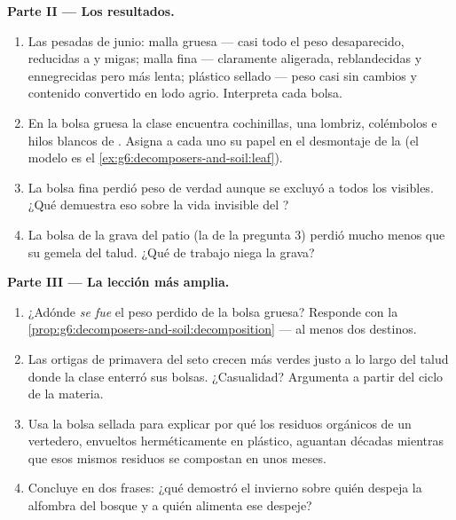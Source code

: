 \begin{problem}
\medskip\noindent\textbf{Parte II --- Los resultados.}
\begin{enumerate}[resume]
  \item Las pesadas de junio: malla gruesa --- casi todo el peso
        desaparecido,  reducidas a  y migas; malla fina
        --- claramente aligerada,  reblandecidas y ennegrecidas
        pero más lenta; plástico sellado --- peso casi sin cambios y
        contenido convertido en lodo agrio. Interpreta cada bolsa.
  \item En la bolsa gruesa la clase encuentra cochinillas, una lombriz,
        colémbolos e hilos blancos de . Asigna a cada uno su papel
        en el desmontaje de la  (el modelo es el
        \cref{ex:g6:decomposers-and-soil:leaf}).
  \item La bolsa fina perdió peso de verdad aunque se excluyó a todos
        los  visibles. ¿Qué demuestra eso sobre la vida
        invisible del ?
  \item La bolsa de la grava del patio (la de la pregunta 3) perdió
        mucho menos que su gemela del talud. ¿Qué  de
        trabajo niega la grava?
\end{enumerate}

\medskip\noindent\textbf{Parte III --- La lección más amplia.}
\begin{enumerate}[resume]
  \item ¿Adónde \emph{se fue} el peso perdido de la bolsa gruesa?
        Responde con la
        \cref{prop:g6:decomposers-and-soil:decomposition} --- al menos
        dos destinos.
  \item Las ortigas de primavera del seto crecen más verdes justo a lo
        largo del talud donde la clase enterró sus bolsas. ¿Casualidad?
        Argumenta a partir del ciclo de la materia.
  \item Usa la bolsa sellada para explicar por qué los residuos
        orgánicos de un vertedero, envueltos herméticamente en
        plástico, aguantan décadas mientras que esos mismos residuos se
        compostan en unos meses.
  \item Concluye en dos frases: ¿qué demostró el invierno sobre quién
        despeja la alfombra del bosque y a quién alimenta ese despeje?
\end{enumerate}
\end{problem}
